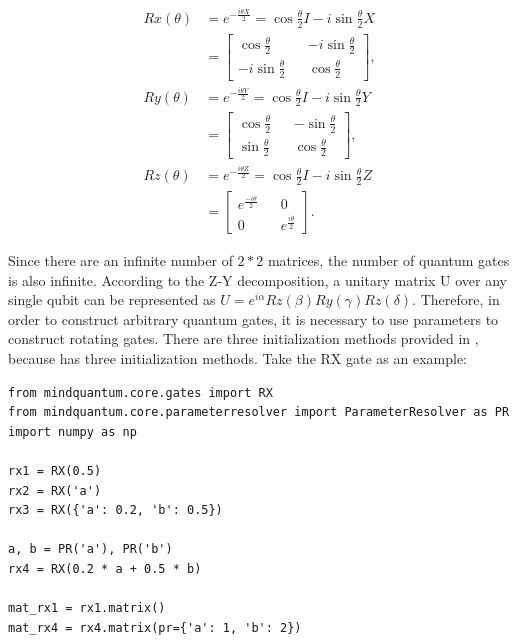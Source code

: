 \begin{align*}
    Rx(\theta) & =
    e^{-\frac{i\theta X}{2}}=
    \cos{\frac{\theta}{2}}I-i\sin{\frac{\theta}{2}}X \\
               & =\begin{bmatrix}
        \cos{\frac{\theta}{2}}   &  & -i\sin{\frac{\theta}{2}} \\
        -i\sin{\frac{\theta}{2}} &  & \cos{\frac{\theta}{2}}
    \end{bmatrix},        \\
    Ry(\theta) & =
    e^{-\frac{i\theta Y}{2}}=
    \cos{\frac{\theta}{2}}I-i\sin{\frac{\theta}{2}}Y \\
               & =    \begin{bmatrix}
        \cos{\frac{\theta}{2}} &  & -\sin{\frac{\theta}{2}} \\
        \sin{\frac{\theta}{2}} &  & \cos{\frac{\theta}{2}}
    \end{bmatrix},    \\
    Rz(\theta) & =
    e^{-\frac{i\theta Z}{2}}=
    \cos{\frac{\theta}{2}}I-i\sin{\frac{\theta}{2}}Z \\
               & =    \begin{bmatrix}
        e^{\frac{-i\theta}{2}} &  & 0                     \\
        0                      &  & e^{\frac{i\theta}{2}}
    \end{bmatrix}.
\end{align*}


Since there are an infinite number of $2*2$ matrices, the number of quantum gates is also infinite. According to the Z-Y decomposition, a unitary matrix U over any single qubit can be represented as $U=e^{i\alpha}Rz(\beta)Ry(\gamma)Rz(\delta)$. Therefore, in order to construct arbitrary quantum gates, it is necessary to use parameters to construct rotating gates. There are three initialization methods provided in \MindQuantum, because \ParameterResolver has three initialization methods. Take the RX gate as an example:

\begin{lstlisting}
from mindquantum.core.gates import RX
from mindquantum.core.parameterresolver import ParameterResolver as PR
import numpy as np

rx1 = RX(0.5)
rx2 = RX('a')
rx3 = RX({'a': 0.2, 'b': 0.5})

a, b = PR('a'), PR('b')
rx4 = RX(0.2 * a + 0.5 * b)

mat_rx1 = rx1.matrix()
mat_rx4 = rx4.matrix(pr={'a': 1, 'b': 2})
\end{lstlisting}

